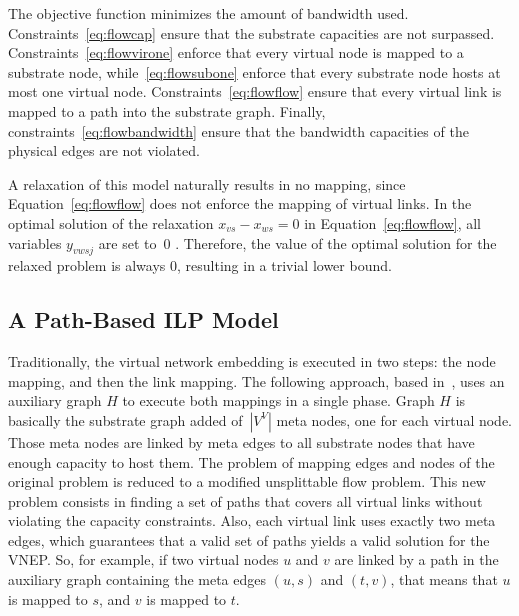\documentclass[conference]{IEEEtran}
\begin{document}
The objective function minimizes the amount of bandwidth used. 
Constraints~\eqref{eq:flowcap} ensure that the substrate capacities are not surpassed. 
Constraints~\eqref{eq:flowvirone} enforce that every virtual node is mapped to a substrate node, while~\eqref{eq:flowsubone} enforce that every substrate node hosts at most one virtual node. 
Constraints~\eqref{eq:flowflow}
ensure that every virtual link is mapped to a path into the substrate graph. Finally, constraints~\eqref{eq:flowbandwidth} ensure that the bandwidth capacities of the physical edges are not violated.

A relaxation of this model naturally results in no mapping, since Equation~\eqref{eq:flowflow} does not enforce the mapping of virtual links. 
In the optimal solution of the relaxation $x_{vs}-x_{ws}=0$ in Equation~\ref{eq:flowflow}, 
all variables $y_{vwsj}$ are set to~$0$ . 
Therefore, the value of the optimal solution for the relaxed problem is always $0$, resulting in a trivial lower bound.




\subsection{A Path-Based ILP Model}
Traditionally, the virtual network embedding is executed in two steps: the node mapping, and then the link mapping. 
The following approach, based in~\cite{Chowdhury:2012}, uses an auxiliary graph $H$ to execute both mappings in a single phase. 
Graph $H$ is basically the substrate graph added of~$|V^{V}|$ meta nodes, one for each virtual node. 
Those meta nodes are linked by meta edges to all substrate nodes that have enough capacity to host them. 
The problem of mapping edges and nodes of the original problem is reduced to a modified unsplittable flow problem. 
This new problem consists in finding a set of paths that covers all virtual links without violating the capacity constraints. 
Also, each virtual link uses exactly two meta edges, which guarantees that a valid set of paths yields a valid solution for the VNEP.
So, for example, if two virtual nodes $u$ and $v$ are linked by a path in the auxiliary graph containing the meta edges $(u,s)$ and $(t,v)$, that means that $u$ is mapped to $s$, and $v$ is mapped to $t$.
\end{document}
